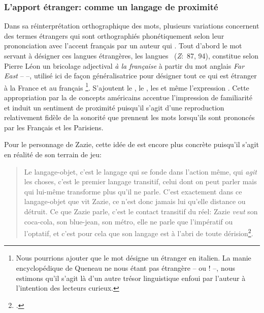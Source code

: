\subsubsection{L'apport étranger: comme un langage de proximité}
Dans sa réinterprétation orthographique des mots, plusieurs variations concernent des termes étrangers qui sont orthographiés phonétiquement selon leur prononciation avec l'accent français par un auteur qui .
Tout d'abord le mot servant à désigner ces langues étrangères, les langues ~(\textit{Z}:~87, 94), constitue selon Pierre Léon un bricolage adjectival \textit{à la française} à partir du mot anglais \textit{Far East} --  --, utilisé ici de façon généralisatrice pour désigner tout ce qui est étranger à la France et au français \footnote{Nous pourrions ajouter que le mot  désigne un étranger en italien.
La manie encyclopédique de Queneau ne nous étant pas étrangère -- ou ! --, nous estimons qu'il s'agit là d'un autre trésor linguistique enfoui par l'auteur à l'intention des lecteurs curieux.}.
S'ajoutent le , le , les  et même l'expression .
Cette appropriation par la  de concepts américains accentue l'impression de familiarité et induit un sentiment de proximité puisqu'il s'agit d'une reproduction relativement fidèle de la sonorité que prennent les mots lorsqu'ils sont prononcés par les Français et les Parisiens.
\par
Pour le personnage de Zazie, cette idée de  est encore plus concrète puisqu'il s'agit en réalité de son terrain de jeu:
\begin{quote}
  \begin{singlespace}
    \small
    Le langage-objet, c'est le langage qui se fonde dans l'action même, qui \textit{agit} les choses, c'est le premier langage transitif, celui dont on peut parler mais qui lui-même transforme plus qu'il ne parle. C'est exactement dans ce langage-objet que vit Zazie, ce n'est donc jamais lui qu'elle distance ou détruit. Ce que Zazie parle, c'est le contact transitif du réel: Zazie \textit{veut} son coca-cola, son blue-jean, son métro, elle ne parle que l'impératif ou l'optatif, et c'est pour cela que son langage est à l'abri de toute dérision\footcite[128]{Barthes1964}.
    \normalsize
  \end{singlespace}
\end{quote}
